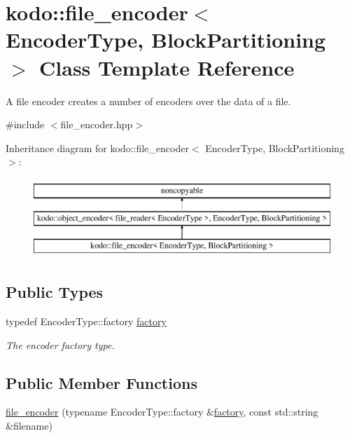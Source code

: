 \hypertarget{classkodo_1_1file__encoder}{\section{kodo\-:\-:file\-\_\-encoder$<$ Encoder\-Type, Block\-Partitioning $>$ Class Template Reference}
\label{classkodo_1_1file__encoder}
}


A file encoder creates a number of encoders over the data of a file.  




{\ttfamily \#include $<$file\-\_\-encoder.\-hpp$>$}

Inheritance diagram for kodo\-:\-:file\-\_\-encoder$<$ Encoder\-Type, Block\-Partitioning $>$\-:\begin{figure}[H]
\begin{center}
\leavevmode
\includegraphics[height=3.000000cm]{classkodo_1_1file__encoder}
\end{center}
\end{figure}
\subsection*{Public Types}
\begin{DoxyCompactItemize}
\item 
\hypertarget{classkodo_1_1file__encoder_a001b4dac3d316785acc55c2ef8c2ed57}{typedef Encoder\-Type\-::factory \hyperlink{classkodo_1_1file__encoder_a001b4dac3d316785acc55c2ef8c2ed57}{factory}}\label{classkodo_1_1file__encoder_a001b4dac3d316785acc55c2ef8c2ed57}

\begin{DoxyCompactList}\small\item\em The encoder factory type. \end{DoxyCompactList}\end{DoxyCompactItemize}
\subsection*{Public Member Functions}
\begin{DoxyCompactItemize}
\item 
\hyperlink{classkodo_1_1file__encoder_a22a8775c016620c2afa94ad36d602db9}{file\-\_\-encoder} (typename Encoder\-Type\-::factory \&\hyperlink{classkodo_1_1file__encoder_a001b4dac3d316785acc55c2ef8c2ed57}{factory}, const std\-::string \&filename)
\end{DoxyCompactItemize}


